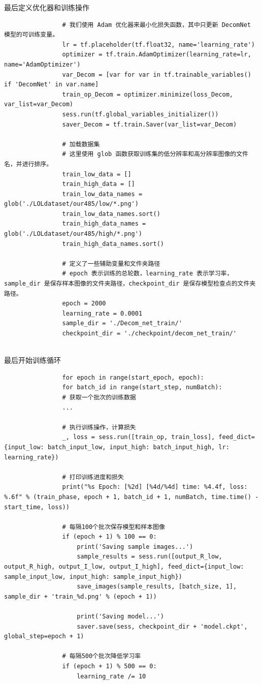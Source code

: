\documentclass[letterpaper,12pt]{article}
\begin{document}
			最后定义优化器和训练操作
			
			\lstset{language=python,breaklines=true}
			\begin{lstlisting}
				# 我们使用 Adam 优化器来最小化损失函数，其中只更新 DecomNet 模型的可训练变量。
				lr = tf.placeholder(tf.float32, name='learning_rate')
				optimizer = tf.train.AdamOptimizer(learning_rate=lr, name='AdamOptimizer')
				var_Decom = [var for var in tf.trainable_variables() if 'DecomNet' in var.name]
				train_op_Decom = optimizer.minimize(loss_Decom, var_list=var_Decom)
				sess.run(tf.global_variables_initializer())
				saver_Decom = tf.train.Saver(var_list=var_Decom)
				
				# 加载数据集
				# 这里使用 glob 函数获取训练集的低分辨率和高分辨率图像的文件名，并进行排序。
				train_low_data = []
				train_high_data = []
				train_low_data_names = glob('./LOLdataset/our485/low/*.png') 
				train_low_data_names.sort()
				train_high_data_names = glob('./LOLdataset/our485/high/*.png') 
				train_high_data_names.sort()
				
				# 定义了一些辅助变量和文件夹路径
				# epoch 表示训练的总轮数，learning_rate 表示学习率，sample_dir 是保存样本图像的文件夹路径，checkpoint_dir 是保存模型检查点的文件夹路径。
				epoch = 2000
				learning_rate = 0.0001
				sample_dir = './Decom_net_train/'
				checkpoint_dir = './checkpoint/decom_net_train/'
				
			\end{lstlisting}
			
			最后开始训练循环
			
			\lstset{language=python,breaklines=true}
			\begin{lstlisting}
				for epoch in range(start_epoch, epoch):
				for batch_id in range(start_step, numBatch):
				# 获取一个批次的训练数据
				...
	
				# 执行训练操作，计算损失
				_, loss = sess.run([train_op, train_loss], feed_dict={input_low: batch_input_low, input_high: batch_input_high, lr: learning_rate})
	
				# 打印训练进度和损失
				print("%s Epoch: [%2d] [%4d/%4d] time: %4.4f, loss: %.6f" % (train_phase, epoch + 1, batch_id + 1, numBatch, time.time() - start_time, loss))
	
				# 每隔100个批次保存模型和样本图像
				if (epoch + 1) % 100 == 0:
					print('Saving sample images...')
					sample_results = sess.run([output_R_low, output_R_high, output_I_low, output_I_high], feed_dict={input_low: sample_input_low, input_high: sample_input_high})
					save_images(sample_results, [batch_size, 1], sample_dir + 'train_%d.png' % (epoch + 1))
				
					print('Saving model...')
					saver.save(sess, checkpoint_dir + 'model.ckpt', global_step=epoch + 1)
				
				# 每隔500个批次降低学习率
				if (epoch + 1) % 500 == 0:
					learning_rate /= 10
			\end{lstlisting}
			
\end{document}
